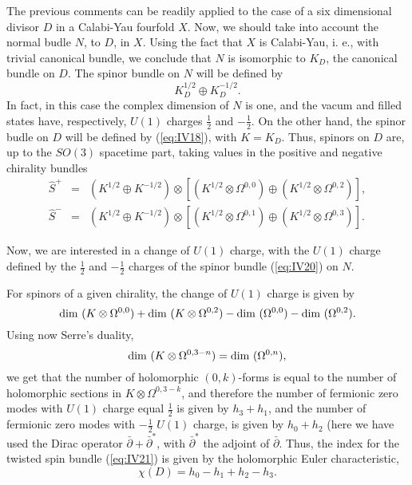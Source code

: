 The previous comments can be readily applied to the case of a
six dimensional divisor $D$ in a Calabi-Yau fourfold $X$. Now, we
should take into account the normal budle $N$, to $D$, in $X$.
Using the fact that $X$ is Calabi-Yau, i. e., with trivial
canonical bundle, we conclude that $N$ is isomorphic to $K_D$,
the canonical bundle on $D$. The spinor bundle on $N$ will be
defined by
\begin{equation}
K_D^{1/2} \oplus K_D^{-1/2}.
\label{eq:IV20}
\end{equation}
In fact, in this case the complex dimension of $N$ is one, and
the vacum and filled states have, respectively, $U(1)$ charges
$\frac {1}{2}$ and $- \frac
{1}{2}$. On the other hand, the spinor budle on $D$ will be
defined by (\ref{eq:IV18}), with $K=K_D$. Thus, spinors on $D$
are, up to the $SO(3)$ spacetime part, taking values in the
positive and negative chirality bundles
\begin{eqnarray}
\hat{S}^+ & = & (K^{1/2} \oplus K^{-1/2}) \otimes [ (K^{1/2} \otimes
\Omega^{0,0}) \oplus (K^{1/2} \otimes \Omega^{0,2})], \nonumber \\
\hat{S}^- & = & (K^{1/2} \oplus K^{-1/2}) \otimes [ (K^{1/2} \otimes
\Omega^{0,1}) \oplus (K^{1/2} \otimes \Omega^{0,3})].
\label{eq:IV21}
\end{eqnarray}
  
Now, we are interested in a change of $U(1)$ charge, with the
$U(1)$ charge defined by the $\frac {1}{2}$ and $-\frac {1}{2}$
charges of the spinor bundle (\ref{eq:IV20}) on $N$. 
  
For spinors of a given chirality,
the change of $U(1)$ charge is given by 
\begin{equation}
\hbox {dim }(K \otimes \Omega^{0,0}) + \hbox {dim }(K \otimes
\Omega^{0,2}) - \hbox {dim } (\Omega^{0,0}) - \hbox {dim }
(\Omega^{0,2}).
\label{eq:IV23}
\end{equation}
Using now Serre's duality,
\begin{equation}
\hbox {dim }(K\otimes \Omega^{0,3-n}) = \hbox {dim
}(\Omega^{0,n}),
\label{eq:IV24}
\end{equation}
we get that the number of holomorphic $(0,k)$-forms is equal to
the number of holomorphic sections in $K \otimes \Omega^{0,3-k}$,
and therefore the number of fermionic zero modes with $U(1)$
charge equal $\frac {1}{2}$ is given by $h_3+h_1$, and the number
of fermionic zero modes with $- \frac {1}{2}$ $U(1)$ charge, is
given by $h_0+h_2$ (here we have used the Dirac operator
$\bar{\partial}+\bar{\partial}^*$, with $\bar{\partial}^*$ the
adjoint of $\bar{\partial}$. Thus, the index for the twisted spin
bundle (\ref{eq:IV21}) is given by the holomorphic Euler
characteristic,
\begin{equation}
\chi(D) = h_0 -h_1 +h_2 -h_3.
\end{equation}
  
